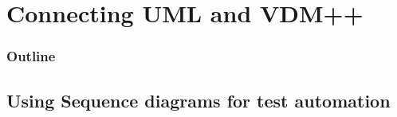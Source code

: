 %
%
\section{Connecting UML and VDM++}
%
%
\begin{frame}
  \frametitle{Outline}
  \tableofcontents[current]
\end{frame}


%
%
%
%	  	
%
%
%
%
%
%	  	
%
%
%
%


\subsection{Using Sequence diagrams for test automation}

